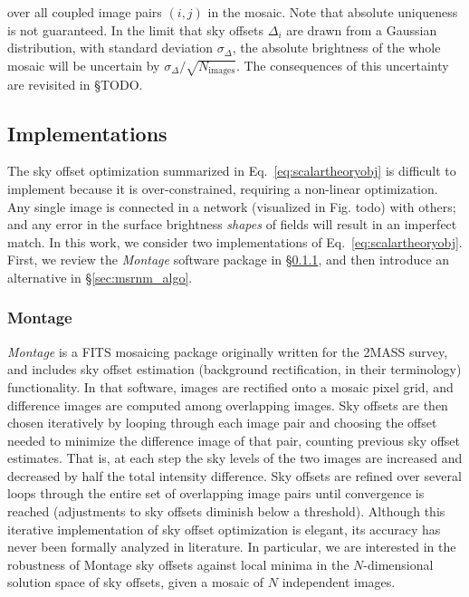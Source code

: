 \documentclass[iop]{emulateapj}
\newcommand{\sw}[1]{\textit{#1}} %
\newcommand{\todo}[1]{\textcolor{BurntOrange}{\textsf{#1}}} %
\newcommand{\Eq}[1]{Eq.~\ref{eq:#1}}  %
\newcommand{\Sec}[1]{\S\ref{sec:#1}}  %
\begin{document}
\noindent over all coupled image pairs $(i,j)$ in the mosaic.
Note that absolute uniqueness is not guaranteed.
In the limit that sky offsets $\Delta_i$ are drawn from a Gaussian distribution, with standard deviation $\sigma_\Delta$, the absolute brightness of the whole mosaic will be uncertain by $\sigma_\Delta / \sqrt{N_\mathrm{images}}$.
The consequences of this uncertainty are revisited in \S\todo{TODO}.

\subsection{Implementations}
\label{sec:offset_algos}

The sky offset optimization summarized in \Eq{scalartheoryobj} is difficult to implement because it is over-constrained, requiring a non-linear optimization.
Any single image is connected in a network (visualized in Fig. \todo{todo}) with others; and any error in the surface brightness \emph{shapes} of fields will result in an imperfect match.
In this work, we consider two implementations of \Eq{scalartheoryobj}.
First, we review the \sw{Montage} software package in \Sec{montage_algo}, and then introduce an alternative in \Sec{msrnm_algo}.

\subsubsection{Montage}
\label{sec:montage_algo}

\sw{Montage} is a FITS mosaicing package \citep{Berriman:2008} originally written for the 2MASS survey, and includes sky offset estimation (background rectification, in their terminology) functionality.
In that software, images are rectified onto a mosaic pixel grid, and difference images are computed among overlapping images.
Sky offsets are then chosen iteratively by looping through each image pair and choosing the offset needed to minimize the difference image of that pair, counting previous sky offset estimates.
That is, at each step the sky levels of the two images are increased and decreased by half the total intensity difference.
Sky offsets are refined over several loops through the entire set of overlapping image pairs until convergence is reached (adjustments to sky offsets diminish below a threshold).
Although this iterative implementation of sky offset optimization is elegant, its accuracy has never been formally analyzed in literature.
In particular, we are interested in the robustness of Montage sky offsets against local minima in the $N$-dimensional solution space of sky offsets, given a mosaic of $N$ independent images.
\end{document}
